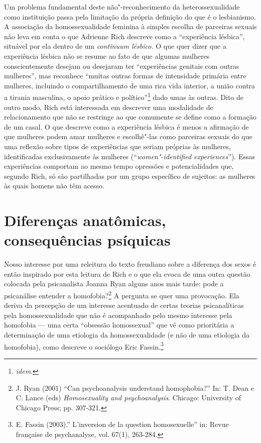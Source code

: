 Um problema fundamental deste não"-reconhecimento da heterossexualidade
como instituição passa pela limitação da própria definição do que é o
lesbianismo. A associação da homossexualidade feminina à simples escolha
de parceiras sexuais não leva em conta o que Adrienne Rich descreve como
a ``experiência lésbica'', situável por ela dentro de um \emph{continuum
lésbico.} O que quer dizer que a experiência lésbica não se resume ao
fato de que algumas mulheres conscientemente desejam ou desejaram ter
``experiências genitais com outras mulheres'', mas reconhece ``muitas
outras formas de intensidade primária entre mulheres, incluindo o
compartilhamento de uma rica vida interior, a união contra a tirania
masculina, o apoio prático e político''\footnote{\emph{idem}.} dado umas
às outras. Dito de outro modo, Rich está interessada em descrever uma
modalidade de relacionamento que não se restringe ao que comumente se
define como a formação de um casal. O que descreve como a experiência
lésbica é menos a afirmação de que mulheres podem amar mulheres e
escolhê"-las como parceiras sexuais do que uma reflexão sobre tipos de
experiências que seriam próprias às mulheres, identificadas
exclusivamente às mulheres (``\emph{women"-identified experiences}'').
Essas experiências comportam ao mesmo tempo opressões e potencialidades
que, segundo Rich, só são partilhadas por um grupo específico de
sujeitos: as mulheres às quais homens não têm acesso.

\section{Diferenças anatômicas, consequências psíquicas}

Nosso interesse por uma releitura do texto freudiano sobre a diferença
dos sexos é então inspirado por esta leitura de Rich e o que ela evoca
de uma outra questão colocada pela psicanalista Joanna Ryan alguns anos
mais tarde: pode a psicanálise entender a homofobia?\footnote{J. Ryan
  (2001) ``Can psychoanalysis understand homophobia?'' In: T. Dean e C.
  Lance (eds) \emph{Homosexuality and psychoanalysis}. Chicago:
  University of Chicago Press; pp. 307-321.} A pergunta se quer uma
provocação. Ela deriva da percepção de um interesse acentuado de certas
teorias psicanalíticas pela homossexualidade que não é acompanhado pelo
mesmo interesse pela homofobia --- uma certa ``obsessão homossexual'' que
vê como prioritária a determinação de uma etiologia da homossexualidade
(e não de uma etiologia da homofobia), como descreve o sociólogo Eric
Fassin.\footnote{E. Fassin (2003).'' L'inversion de la question
  homosexuelle'' in: Revue française de psychanalyse, vol. 67(1),
  263-284.}

